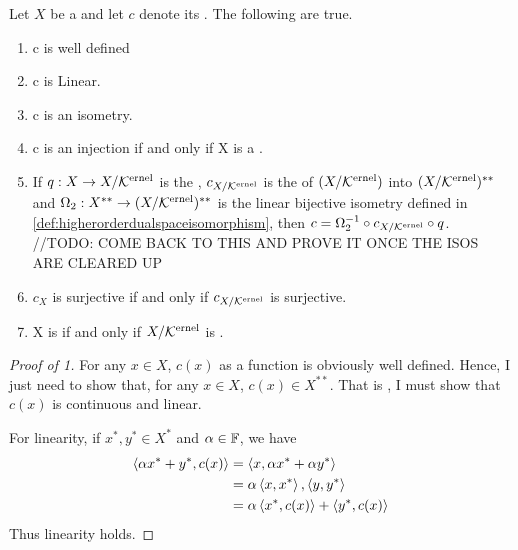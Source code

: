 \begin{prop}
\label{prop:canonicalembedding}
    Let $X$ be a \SeminormedSpace 
    and let $c$ denote its 
    \CanonicalEmbedding. 
    The following are true. 
    \begin{enumerate}
        \item c is well defined
        \item c is Linear. 
        \item c is an isometry. 
        \item c is an injection if and only if X is a \NormedSpace. 
        \item If $q:X \to X/\bf\mathcal{K}\rm^{ernel}$ is the \QuotientMap, 
		$c_{X/\bf\mathcal{K}\rm^{ernel}}$ is the \CanonicalEmbedding of $(X/\bf\mathcal{K}\rm^{ernel})$ into $(X/\bf\mathcal{K}\rm^{ernel})^{**}$ 
		and $\Omega_2:X^{**} \to (X/\bf\mathcal{K}\rm^{ernel})^{**}$ 
		is the linear bijective isometry defined in 
		\ref{def:higherorderdualspaceisomorphism}, 
		then $c = \Omega_2^{-1} \circ c_{X/\bf\mathcal{K}\rm^{ernel}} \circ q$. 
		//TODO: COME BACK TO THIS AND PROVE IT ONCE THE ISOS ARE CLEARED UP
        \item $c_X$ is surjective if and only if 
        $c_{X/\bf\mathcal{K}\rm^{ernel}}$ is surjective. 
        \item X is \Reflexive if and only if $X/\bf\mathcal{K}\rm^{ernel}$ is \Reflexive.
    \end{enumerate}
    \begin{proof}[Proof of 1]
		For any $x \in X$, 
		$c(x)$ as a function is obviously well defined. 
        Hence, I just need to show that, 
		for any
        $x \in X$, 
		$c(x) \in X^{**}$.
		That is
		, I must show that
		$c(x)$ is
        continuous and
        linear. 
        
		For linearity, if 
		$x^*, y^* \in X^*$ and 
		$\alpha \in \mathbb{F}$, 
		we have 
		\begin{align*}
		\left\langle \alpha x^*+ y^* , c(x)  \right\rangle & = \left\langle x, \alpha x^*+\alpha y^*  \right\rangle\\
		& = \alpha \left\langle x, x^* \right\rangle, \left\langle y, y^* \right\rangle\\
		& = \alpha \left\langle x^*, c(x) \right\rangle + \left\langle y^*, c(x) \right\rangle
		\end{align*}
		Thus linearity holds.
		

\end{proof}
\end{prop}
